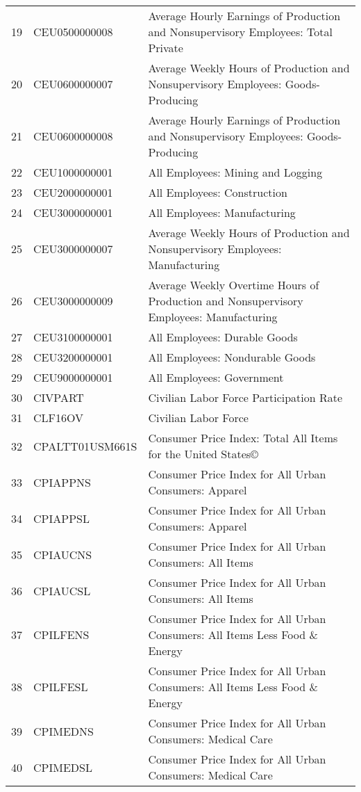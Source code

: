 \begin{table}[ht]
\begin{tabular}{rll}
  19 & CEU0500000008 & Average Hourly Earnings of Production and Nonsupervisory Employees: Total Private \\ 
  20 & CEU0600000007 & Average Weekly Hours of Production and Nonsupervisory Employees: Goods-Producing \\ 
  21 & CEU0600000008 & Average Hourly Earnings of Production and Nonsupervisory Employees: Goods-Producing \\ 
  22 & CEU1000000001 & All Employees: Mining and Logging \\ 
  23 & CEU2000000001 & All Employees: Construction \\ 
  24 & CEU3000000001 & All Employees: Manufacturing \\ 
  25 & CEU3000000007 & Average Weekly Hours of Production and Nonsupervisory Employees: Manufacturing \\ 
  26 & CEU3000000009 & Average Weekly Overtime Hours of Production and Nonsupervisory Employees: Manufacturing \\ 
  27 & CEU3100000001 & All Employees: Durable Goods \\ 
  28 & CEU3200000001 & All Employees: Nondurable Goods \\ 
  29 & CEU9000000001 & All Employees: Government \\ 
  30 & CIVPART & Civilian Labor Force Participation Rate \\ 
  31 & CLF16OV & Civilian Labor Force \\ 
  32 & CPALTT01USM661S & Consumer Price Index: Total All Items for the United States© \\ 
  33 & CPIAPPNS & Consumer Price Index for All Urban Consumers: Apparel \\ 
  34 & CPIAPPSL & Consumer Price Index for All Urban Consumers: Apparel \\ 
  35 & CPIAUCNS & Consumer Price Index for All Urban Consumers: All Items \\ 
  36 & CPIAUCSL & Consumer Price Index for All Urban Consumers: All Items \\ 
  37 & CPILFENS & Consumer Price Index for All Urban Consumers: All Items Less Food \& Energy \\ 
  38 & CPILFESL & Consumer Price Index for All Urban Consumers: All Items Less Food \& Energy \\ 
  39 & CPIMEDNS & Consumer Price Index for All Urban Consumers: Medical Care \\ 
  40 & CPIMEDSL & Consumer Price Index for All Urban Consumers: Medical Care \\ 

\end{tabular}
\end{table}

